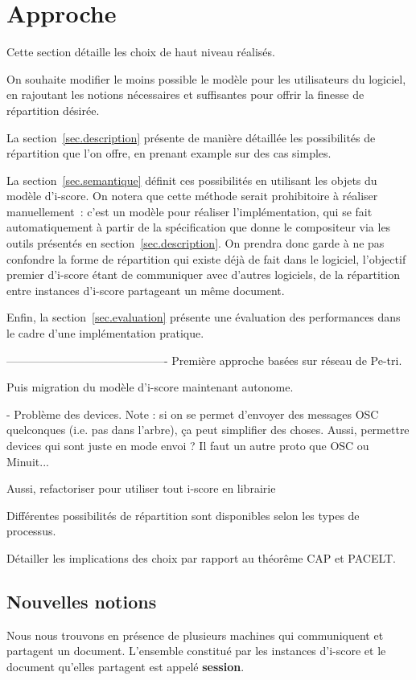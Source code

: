 \documentclass{article}
\newcommand\vocab[1]{\textbf{#1}}
\begin{document}
\section{Approche}
Cette section détaille les choix de haut niveau réalisés.

On souhaite modifier le moins possible le modèle pour les utilisateurs du logiciel, 
en rajoutant les notions nécessaires et suffisantes pour offrir la finesse de répartition désirée.

La section~\ref{sec.description} présente de manière détaillée les possibilités 
de répartition que l'on offre, en prenant example sur des cas simples.

La section~\ref{sec.semantique} définit ces possibilités en utilisant les objets du modèle d'i-score. 
On notera que cette méthode serait prohibitoire à réaliser manuellement~: c'est un modèle pour réaliser l'implémentation, qui se fait automatiquement à partir de la spécification que donne le compositeur via les outils présentés en section~\ref{sec.description}. 
On prendra donc garde à ne pas confondre la forme de répartition qui existe déjà de fait dans le logiciel, l'objectif premier d'i-score étant de communiquer avec d'autres logiciels, de la répartition entre instances d'i-score partageant un même document.

Enfin, la section~\ref{sec.evaluation} présente une évaluation des performances dans le cadre 
d'une implémentation pratique.

-------------------------------------------
Première approche basées sur réseau de Pe-tri.

Puis migration du modèle d'i-score maintenant autonome.


- Problème des devices. Note : si on se permet d'envoyer des messages OSC quelconques (i.e. pas dans l'arbre), ça peut simplifier des choses. Aussi, permettre devices qui sont juste en mode envoi ? Il faut un autre proto que OSC ou Minuit...

Aussi, refactoriser pour utiliser tout i-score en librairie

Différentes possibilités de répartition sont disponibles selon les types de processus.

Détailler les implications des choix par rapport au théorême CAP et PACELT.

\subsection{Nouvelles notions}
Nous nous trouvons en présence de plusieurs machines qui communiquent et partagent un document.
L'ensemble constitué par les instances d'i-score et le document qu'elles partagent est appelé \vocab{session}.
\end{document}
